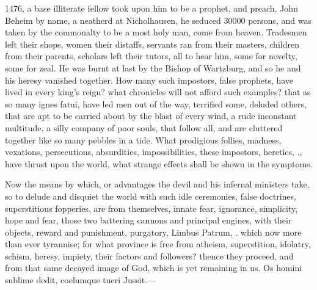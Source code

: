 {1476, a base illiterate fellow took upon him to be a prophet, and
preach, John Beheim by name, a neatherd at Nicholhausen, he seduced
30\thinspace{}000 persons, and was taken by the commonalty to be a most holy man,
come from heaven.  Tradesmen left their shops, women their
distaffs, servants ran from their masters, children from their parents,
scholars left their tutors, all to hear him, some for novelty, some for
zeal. He was burnt at last by the Bishop of Wartzburg, and so he and
his heresy vanished together. How many such impostors, false prophets,
have lived in every king's reign? what chronicles will not afford such
examples? that as so many ignes fatui, have led men out of the way,
terrified some, deluded others, that are apt to be carried about by the
blast of every wind, a rude inconstant multitude, a silly company of
poor souls, that follow all, and are cluttered together like so many
pebbles in a tide. What prodigious follies, madness, vexations,
persecutions, absurdities, impossibilities, these impostors, heretics,
\etc{}., have thrust upon the world, what strange effects shall be shown in
the symptoms.

Now the means by which, or advantages the devil and his infernal
ministers take, so to delude and disquiet the world with such idle
ceremonies, false doctrines, superstitious fopperies, are from
themselves, innate fear, ignorance, simplicity, hope and fear, those
two battering cannons and principal engines, with their objects, reward
and punishment, purgatory, Limbus Patrum, \etc{}. which now more than ever
tyrannise; for what province is free from atheism, superstition,
idolatry, schism, heresy, impiety, their factors and followers? thence
they proceed, and from that same decayed image of God, which is yet
remaining in us.
Os homini sublime dedit, coelumque tueri
Jussit.---

}
